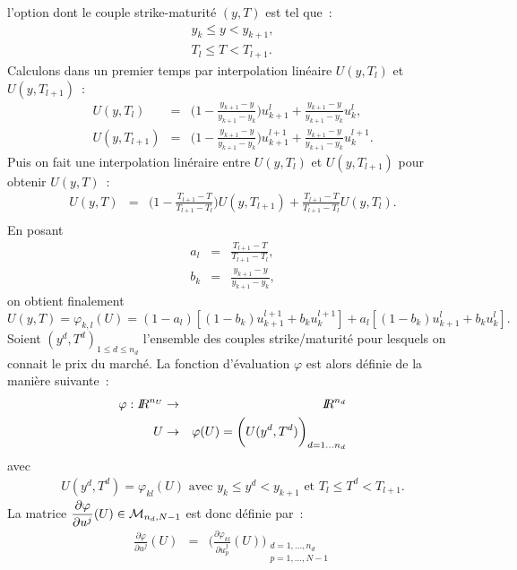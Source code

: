 l'option dont le couple strike-maturit\'e $(y,T)$ est tel que~:
\begin{eqnarray*}
y_k \leq y < y_{k+1},\\
T_l \leq T < T_{l+1}.
\end{eqnarray*}
Calculons dans un premier temps par interpolation lin\'eaire 
$U(y,T_l)$ et $U(y,T_{l+1})$~:
\begin{eqnarray*}
U(y,T_l) &=& \biggl(1-\frac{y_{k+1}-y}{y_{k+1}-y_k}\biggr)
u_{k+1}^l + \frac{y_{k+1}-y}{y_{k+1}-y_k}u_k^l,\\
U(y,T_{l+1}) &=& \biggl(1-\frac{y_{k+1}-y}{y_{k+1}-y_k}\biggr)
u_{k+1}^{l+1} + \frac{y_{k+1}-y}{y_{k+1}-y_k}u_k^{l+1}.
\end{eqnarray*}
Puis on fait une interpolation lin\'eraire entre $U(y,T_l)$ et 
$U(y,T_{l+1})$ pour obtenir $U(y,T)$~:
\begin{eqnarray*}
U(y,T) &=& \biggl(1-\frac{T_{l+1}-T}{T_{l+1}-T_l}\biggr)U(y,T_{l+1}) 
+ \frac{T_{l+1}-T}{T_{l+1}-T_l}U(y,T_l).\\
\end{eqnarray*}
En posant
\begin{eqnarray*}
a_l &=& \frac{T_{l+1}-T}{T_{l+1}-T_l},\\
b_k &=& \frac{y_{k+1}-y}{y_{k+1}-y_k},
\end{eqnarray*}
on obtient finalement
\begin{equation*}
U(y,T) = \varphi_{k,l}(U) = (1-a_l)[(1-b_k)u_{k+1}^{l+1} 
+ b_ku_k^{l+1}] + a_l[(1-b_k)u_{k+1}^l + b_ku_k^l].
\end{equation*}
Soient $(y^d,T^d)_{1\leq d \leq n_d}$ l'ensemble des couples 
strike/maturit\'e pour lesquels on connait le prix du march\'e. La 
fonction d'\'evaluation $\varphi$ est alors d\'efinie de la 
mani\`ere suivante~:
\begin{eqnarray*}
\varphi : I\!\! R^{n_U} &\rightarrow& I\!\! R^{n_d}\\
U &\rightarrow & \varphi(U) = \biggl(U(y^d,T^d)\biggr)_{d=1...n_d}
\end{eqnarray*}
avec
\begin{eqnarray*}
U(y^d,T^d) = \varphi_{kl}(U) \text{ avec } 
y_k\leq y^d < y_{k+1} \text{ et } T_l\leq T^d < T_{l+1}.
\end{eqnarray*}
La matrice ${\displaystyle\frac{\partial \varphi}{\partial u^j}(U)} \in 
\mathcal{M}_{n_d,N-1}$ est donc d\'efinie par~:
\begin{eqnarray*}
\frac{\partial \varphi}{\partial u^j}(U) &=&  
\biggl(\frac{\partial \varphi_{kl}}{\partial u^j_p}(U) 
\biggr)_{\substack{d=1,...,n_d\\p=1,...,N-1}}
\end{eqnarray*}

